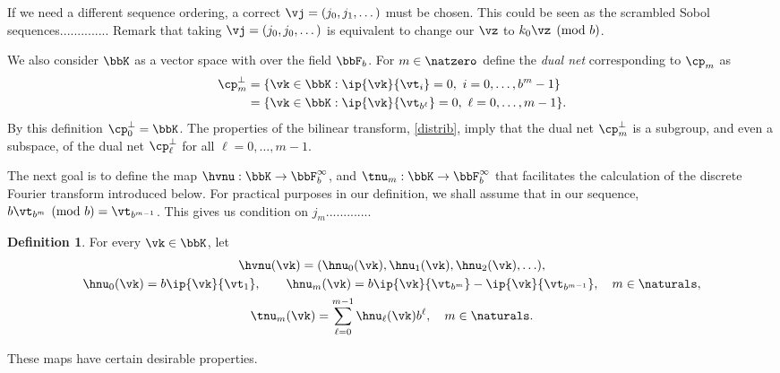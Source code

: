 \documentclass[]{elsarticle}
\theoremstyle{definition}
\newtheorem{defin}{Definition}
\begin{document}
If we need a different sequence ordering, a correct $\vj=(j_0,j_1,\dots)$ must be chosen. This could be seen as the scrambled Sobol sequences.............. Remark that taking $\vj=(j_0,j_0,\dots)$ is equivalent to change our $\vz$ to $k_0\vz \pmod b$.

We also consider $\bbK$ as a vector space with over the field $\bbF_b$.  For $m \in \natzero$ define the \emph{dual net} corresponding to $\cp_m$ as
\begin{align*}
\cp^{\perp}_m &= \{\vk \in \bbK : \ip{\vk}{\vt_i} = 0, \ i=0, \ldots, b^m-1\} \\
&= \{\vk \in \bbK : \ip{\vk}{\vt_{b^{\ell}}} = 0, \ \ell=0, \ldots, m-1\}.
\end{align*}
By this definition $\cp^{\perp}_{0}=\bbK$.  The properties of the bilinear transform, \eqref{distrib}, imply that the dual net $\cp^{\perp}_m$ is a subgroup, and even a subspace, of the dual net $\cp^{\perp}_\ell$ for all $\ell=0, \ldots, m-1$.

The next goal is to define the map $\hvnu : \bbK \to \bbF_b^{\infty}$, and $\tnu_m : \bbK \to \bbF_b^{\infty}$ that facilitates the calculation of the discrete Fourier transform introduced below. For practical purposes in our definition, we shall assume that in our sequence, $b\vt_{b^m}\pmod b=\vt_{b^{m-1}}$. This gives us condition on $j_m$.............

\begin{defin} \label{numapdef} For every $\vk \in \bbK$, let
\begin{subequations} \label{numapdefeq}
\begin{gather}
\hvnu(\vk)=(\hnu_0(\vk), \hnu_1(\vk), \hnu_2(\vk), \ldots ), \\
\hnu_0(\vk) = b\ip{\vk}{\vt_{1}}, \qquad \hnu_m(\vk)=b\ip{\vk}{\vt_{b^m}}-\ip{\vk}{\vt_{b^{m-1}}}, \quad m \in \naturals, \\
\tnu_m(\vk) = \sum_{\ell=0}^{m-1} \hnu_{\ell}(\vk) b^{\ell}, \quad m \in \naturals.
\end{gather}
\end{subequations}
\end{defin}

These maps have certain desirable properties.
\end{document}
